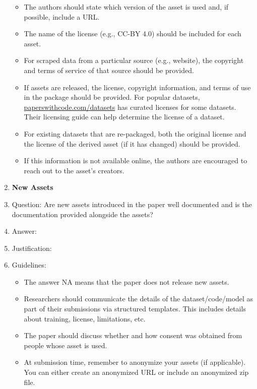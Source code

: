 \documentclass{article}
\begin{document}
\begin{enumerate}
\begin{itemize}
            \item The authors should state which version of the asset is used and, if possible, include a URL.
            \item The name of the license (e.g., CC-BY 4.0) should be included for each asset.
            \item For scraped data from a particular source (e.g., website), the copyright and terms of service of that source should be provided.
            \item If assets are released, the license, copyright information, and terms of use in the package should be provided. For popular datasets, \url{paperswithcode.com/datasets} has curated licenses for some datasets. Their licensing guide can help determine the license of a dataset.
            \item For existing datasets that are re-packaged, both the original license and the license of the derived asset (if it has changed) should be provided.
            \item If this information is not available online, the authors are encouraged to reach out to the asset's creators.
        \end{itemize}
    \item {\bf New Assets}
    \item[] Question: Are new assets introduced in the paper well documented and is the documentation provided alongside the assets?
    \item[] Answer: \answerTODO{} %
    \item[] Justification: \justificationTODO{}
    \item[] Guidelines:
        \begin{itemize}
            \item The answer NA means that the paper does not release new assets.
            \item Researchers should communicate the details of the dataset/code/model as part of their submissions via structured templates. This includes details about training, license, limitations, etc.
            \item The paper should discuss whether and how consent was obtained from people whose asset is used.
            \item At submission time, remember to anonymize your assets (if applicable). You can either create an anonymized URL or include an anonymized zip file.
        \end{itemize}

\end{enumerate}
\end{document}

